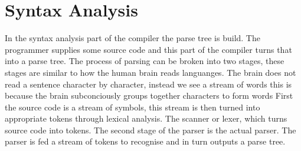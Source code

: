 \section{Syntax Analysis}\label{sec:syntaxAnalysis}
In the syntax analysis part of the compiler the parse tree is build.
The programmer supplies some source code and this part of the compiler turns that into a parse tree.
The process of parsing can be broken into two stages, these stages are similar to how the human brain reads languanges.
The brain does not read a sentence character by character, instead we see a stream of words this is because the brain subconciously groups together characters to form words
First the source code is a stream of symbols, this stream is then turned into appropriate tokens through lexical analysis.
The scanner or lexer, which turns source code into tokens.
The second stage of the parser is the actual parser.
The parser is fed a stream of tokens to recognise and in turn outputs a parse tree.


